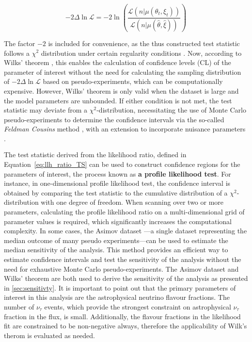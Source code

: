 \begin{equation}\label{eq:llh_ratio_TS}
    -2 \Delta \ln \mathcal{L} = -2 \ln \left( \frac{\mathcal{L}(n|\mu(\theta_t, \xi_t))}{\mathcal{L}(n|\mu(\hat{\theta}, \hat{\xi}))} \right)
\end{equation}

The factor $-2$ is included for convenience, as the thus constructed test statistic follows a $\chi^2$ distribution under certain regularity conditions . Now, according to Wilks' theorem , this enables the calculation of confidence levels (CL) of the parameter of interest without the need for calculating the sampling distribution of $-2 \Delta \ln \mathcal{L}$ based on pseudo-experiments, which can be computationally expensive. However, Wilks’ theorem is only valid when the dataset is large and the model parameters are unbounded. If either condition is not met, the test statistic may deviate from a $\chi^2$-distribution, necessitating the use of Monte Carlo pseudo-experiments to determine the confidence intervals via the so-called \emph{Feldman Cousins} method , with an extension to incorporate nuisance parameters .

The test statistic derived from the likelihood ratio, defined in Equation~\ref{eq:llh_ratio_TS} can be used to construct confidence regions for the parameters of interest, the process known as \textbf{a profile likelihood test}. For instance, in one-dimensional profile likelihood test, the confidence interval is obtained by comparing the test statistic to the cumulative distribution of a $\chi^2$-distribution with one degree of freedom. When scanning over two or more parameters, calculating the profile likelihood ratio on a multi-dimensional grid of parameter values is required, which significantly increases the computational complexity. In some cases, the Asimov dataset \cite{asimov}—a single dataset representing the median outcome of many pseudo experiments—can be used to estimate the median sensitivity of the analysis. This method provides an efficient way to estimate confidence intervals and test the sensitivity of the analysis without the need for exhaustive Monte Carlo pseudo-experiments. The Asimov dataset and Wilks' theorem are both used to derive the sensitivity of the analysis as presented in \ref{sec:sensitivty}. It is important to point out that the primary parameters of interest in this analysis are the astrophysical neutrino flavour fractions. 
The number of $\nu_{\tau}$ events, which provide the strongest constraint on astrophysical $\nu_{\tau}$ fraction in the flux, is small. Additionally, the flavour fractions in the likelihood fit are constrained to be non-negative always, therefore the applicability of Wilk's therom is evaluated as needed.

